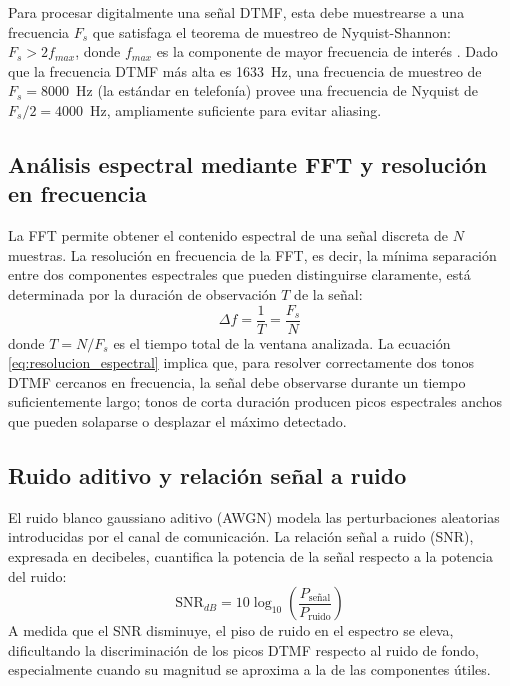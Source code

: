 \documentclass[conference]{IEEEtran}
\begin{document}
Para procesar digitalmente una señal DTMF, esta debe muestrearse a una frecuencia $F_s$ que satisfaga el teorema de muestreo de Nyquist-Shannon: $F_s > 2 f_{max}$, donde $f_{max}$ es la componente de mayor frecuencia de interés \cite{oppenheim}. Dado que la frecuencia DTMF más alta es 1633~Hz, una frecuencia de muestreo de $F_s = 8000$~Hz (la estándar en telefonía) provee una frecuencia de Nyquist de $F_s/2 = 4000$~Hz, ampliamente suficiente para evitar aliasing.

\subsection{Análisis espectral mediante FFT y resolución en frecuencia}

La FFT permite obtener el contenido espectral de una señal discreta de $N$ muestras. La resolución en frecuencia de la FFT, es decir, la mínima separación entre dos componentes espectrales que pueden distinguirse claramente, está determinada por la duración de observación $T$ de la señal:
\begin{equation}
\Delta f = \frac{1}{T} = \frac{F_s}{N}
\label{eq:resolucion_espectral}
\end{equation}
donde $T = N/F_s$ es el tiempo total de la ventana analizada. La ecuación \eqref{eq:resolucion_espectral} implica que, para resolver correctamente dos tonos DTMF cercanos en frecuencia, la señal debe observarse durante un tiempo suficientemente largo; tonos de corta duración producen picos espectrales anchos que pueden solaparse o desplazar el máximo detectado.

\subsection{Ruido aditivo y relación señal a ruido}

El ruido blanco gaussiano aditivo (AWGN) modela las perturbaciones aleatorias introducidas por el canal de comunicación. La relación señal a ruido (SNR), expresada en decibeles, cuantifica la potencia de la señal respecto a la potencia del ruido:
\begin{equation}
\text{SNR}_{dB} = 10 \log_{10}\left(\frac{P_{\text{señal}}}{P_{\text{ruido}}}\right)
\label{eq:snr}
\end{equation}
A medida que el SNR disminuye, el piso de ruido en el espectro se eleva, dificultando la discriminación de los picos DTMF respecto al ruido de fondo, especialmente cuando su magnitud se aproxima a la de las componentes útiles.
\end{document}
